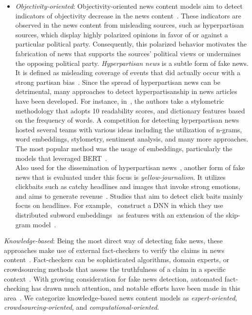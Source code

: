 \begin{description}
\begin{itemize}
        \item \emph{Objectivity-oriented}: Objectivity-oriented news content models aim to detect indicators of objectivity decrease in the news content~\parencite{FakeNewsDetectionOnSocialMediaADataMiningPerspective_Shu}. These indicators are observed in the news content from misleading sources, such as hyperpartisan sources, which display highly polarized opinions in favor of or against a particular political party. Consequently, this polarized behavior motivates the fabrication of news that supports the sources’ political views or undermines the opposing political party. \emph{Hyperpartisan news} is a subtle form of fake news. It is defined as misleading coverage of events that did actually occur with a strong partisan bias~\parencite{FightingMisinformationOnSocialMedia_Pennycook}. Since the spread of hyperpartisan news can be detrimental, many approaches to detect hyperpartisanship in news articles have been developed. For instance, in~\cite{AStylometricInquiry_Potthast}, the authors take a stylometric methodology that adopts 10 readability scores, and dictionary features based on the frequency of words. A competition for detecting hyperpartisan news~\parencite{SemEvalHyperpartisanNewsDetection_Kiesel} hosted several teams with various ideas including the utilization of n-grams, word embeddings, stylometry, sentiment analysis, and many more approaches. The most popular method was the usage of embeddings, particularly the models that leveraged BERT~\parencite{BERT_Devlin}.\\ Also used for the dissemination of hyperpartisan news~\parencite{SemEvalHyperpartisanNewsDetection_Kiesel}, another form of fake news that is evaluated under this focus is \emph{yellow-journalism}. It utilizes clickbaits such as catchy headlines and images that invoke strong emotions, and aims to generate revenue~\parencite{ClickbaitDetectionUsingDL_Agrawal, ClickbaitAndTabloidStrategies_Dolors}. Studies that aim to detect click baits mainly focus on headlines. For example,~\cite{DivingDeepIntoClickbaits_Rony}  construct a DNN in which they use distributed subword embeddings~\parencite{EnrichingWordVectorsWithSubwordInfo_Bojanowski, BagOfTricksForTextClassificatoin_Joulin} as features with an extension of the skip-gram model~\parencite{DistributedRepresentationsOfWords_Mikolov}.
    \end{itemize}
    \item{\emph{Knowledge-based}}: Being the most direct way of detecting fake news, these approaches make use of external fact-checkers to verify the claims in news content~\parencite{FakeNewsDetectionOnSocialMediaADataMiningPerspective_Shu}. Fact-checkers can be sophisticated algorithms, domain experts, or crowdsourcing methods that assess the truthfulness of a claim in a specific context~\parencite{FactChecking_Vlachos}. With growing consideration for fake news detection, automated fact-checking has drawn much attention, and notable efforts have been made in this area~\parencite{AutomatedFactChecking_Thorne, OverviewOfCheckThat_Barroncede}. We categorize knowledge-based news content models as \emph{expert-oriented}, \emph{crowdsourcing-oriented}, and \emph{computational-oriented}.

\end{description}
